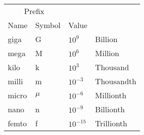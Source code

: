 \begin{tabular}{llll}
\hline
\multicolumn{2}{c}{Prefix}  & &              \\
Name    & Symbol & Value      &              \\
\hline
giga    & G      & $10^9$     & Billion      \\
mega    & M      & $10^6$     & Million      \\
kilo    & k      & $10^3$     & Thousand     \\
milli   & m      & $10^{-3}$  & Thousandth   \\
micro   & $\mu$  & $10^{-6}$  & Millionth    \\
nano    & n      & $10^{-9}$  & Billionth    \\
femto   & f      & $10^{-15}$ & Trillionth   \\
\hline
\end{tabular}